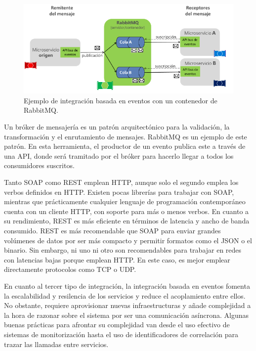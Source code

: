 \documentclass[11pt,spanish,listoffigures,listoftables]{tfgetsinf}
\begin{document}
\begin{itemize}
\begin{figure}[h]
\centering
\includegraphics[scale=0.85]{rabbitmq}
\caption{Ejemplo de integración basada en eventos con un contenedor de RabbitMQ. \cite{DelaTorre2018}}
\end{figure}

Un bróker de mensajería es un patrón arquitectónico para la validación, la transformación y el enrutamiento de mensajes. RabbitMQ es un ejemplo de este patrón. En esta herramienta, el productor de un evento publica este a través de una API, donde será tramitado por el bróker para hacerlo llegar a todos los consumidores suscritos.
 
\end{itemize}

Tanto SOAP como REST emplean HTTP, aunque solo el segundo emplea los verbos definidos en HTTP. Existen pocas librerías para trabajar con SOAP, mientras que prácticamente cualquier lenguaje de programación contemporáneo cuenta con un cliente HTTP, con soporte para más o menos verbos. En cuanto a su rendimiento, REST es más eficiente en términos de latencia y ancho de banda consumido. \cite{Mulligan} REST es más recomendable que SOAP para enviar grandes volúmenes de datos por ser más compacto y permitir formatos como el JSON o el binario. Sin embargo, ni uno ni otro son recomendables para trabajar en redes con latencias bajas porque emplean HTTP. En este caso, es mejor emplear directamente protocolos como TCP o UDP. 

En cuanto al tercer tipo de integración, la integración basada en eventos fomenta la escalabilidad y resilencia de los servicios y reduce el acoplamiento entre ellos. No obstante, requiere aprovisionar nuevas infraestructuras y añade complejidad a la hora de razonar sobre el sistema por ser una comunicación asíncrona. Algunas buenas prácticas para afrontar su complejidad van desde el uso efectivo de sistemas de monitorización hasta el uso de identificadores de correlación para trazar las llamadas entre servicios. \cite{Newman2015a}
\end{document}
